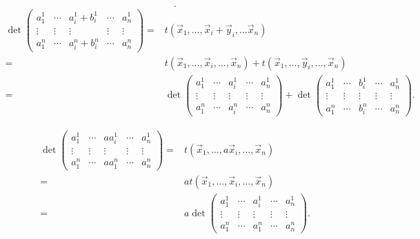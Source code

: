 \begin{observation}
\normalfont 
\[ .\]
\[
\begin{split}
 \det\begin{pmatrix} a^{1}_{1} & \cdots& a^{1}_{i} + b^{1}_{i} & \cdots & a^{1}_{n} \\
	 \vdots & \vdots & \vdots & \vdots & \vdots \\
a^{n}_{1} & \cdots & a^{n}_{i}+b^{n}_{i} & \cdots & a^{n}_{n}\end{pmatrix} = & t\left(\vec{x}_{1}, \ldots, \vec{x}_{i} + \vec{y}_{i} , \ldots \vec{x}_{n}\right) \\
	 = & t\left(\vec{x}_{1}, \ldots, \vec{x}_{i}, \ldots, \vec{x}_{n}\right) + t\left(\vec{x}_{1}, \ldots, \vec{y}_{i}, \ldots, \vec{x}_{n}\right) \\
	 = & \det \begin{pmatrix} a^{1}_{1} & \cdots & a^{1}_{i} & \cdots & a^{1}_{n}\\
	 \vdots & \vdots & \vdots & \vdots & \vdots \\
 a^{n}_{1} & \cdots & a^{n}_{i} & \cdots & a^{n}_{n}\end{pmatrix} + \det \begin{pmatrix} a^{1}_{1} & \cdots & b^{1}_{i} & \cdots & a^{1}_{n}\\
	 \vdots & \vdots & \vdots & \vdots & \vdots \\
 a^{n}_{1} & \cdots & b^{n}_{i} & \cdots & a^{n}_{n} \end{pmatrix}.
\end{split}
\]
\end{observation}

\begin{observation}
\normalfont 
\[
\begin{split}
	\det\begin{pmatrix} a^{1}_{1} & \cdots & a a^{1}_{i} & \cdots & a^{1}_{n} \\
	\vdots & \vdots & \vdots & \vdots & \vdots\\
a^{n}_{1} & \cdots & a a ^{n}_{1} & \cdots & a^{n}_{n}\end{pmatrix} = & t\left(\vec{x}_{1}, \ldots,a \vec{x}_{i}, \ldots, \vec{x}_{n}\right) \\
= & at\left(\vec{x}_{1}, \ldots, \vec{x}_{i}, \ldots, \vec{x}_{n}\right) \\
= & a \det\begin{pmatrix} a^{1}_{1} & \cdots &  a^{1}_{i} & \cdots & a^{1}_{n} \\
	\vdots & \vdots & \vdots & \vdots & \vdots\\
a^{n}_{1} & \cdots &  a ^{n}_{1} & \cdots & a^{n}_{n} \end{pmatrix}.
\end{split}
\]
\end{observation}

